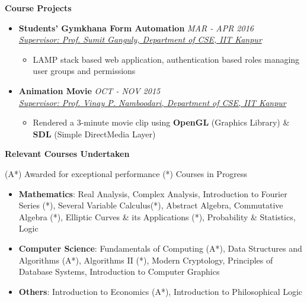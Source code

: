 \documentclass[letterpaper,11pt]{article}
\begin{document}
{\vspace{-1pt}
\Large{\textbf{Course Projects}}
\small
\vspace{-5pt}
\begin{itemize}
    \item \textbf{Students' Gymkhana Form Automation} \hfill \textit{MAR - APR 2016}\\
        \href{http://www.cse.iitk.ac.in/users/sganguly/}{\textit{Supervisor: Prof. Sumit Ganguly, Department of CSE, IIT Kanpur}}
    \vspace{-5pt}
    \begin{itemize}
        \item LAMP stack based web application, authentication based roles managing user groups and permissions
        \vspace{-2pt}
    \end{itemize}
    \vspace{-5pt}
    \item \textbf{Animation Movie} \hfill \textit{OCT - NOV 2015}\\
    \href{https://sites.google.com/site/vinaynamboodiri/}{\textit{Supervisor: Prof. Vinay P. Namboodari, Department of CSE, IIT Kanpur}}
    \vspace{-5pt}
    \begin{itemize}
        \item Rendered a 3-minute movie clip using \textbf{OpenGL} (Graphics Library) \& \textbf{SDL} (Simple DirectMedia Layer)
        \vspace{-2pt}
    \end{itemize}
\end{itemize}

\vspace{-1pt}
\Large{\textbf{Relevant Courses Undertaken}}
\footnotesize{\hfill(A*) Awarded for exceptional performance \hspace{0.25in}  (*) Courses in Progress\\
\small
\vspace{-5pt}
\begin{itemize}
    \item \textbf{Mathematics}:
        Real Analysis, Complex Analysis, Introduction to Fourier Series (*), Several Variable Calculus(*),
        Abstract Algebra, Commutative Algebra (*), Elliptic Curves \& its Applications (*),
        Probability \& Statistics, Logic\\
    \vspace{-2pt}
    \item \textbf{Computer Science}: Fundamentals of Computing (A*), Data Structures and Algorithms (A*), Algorithms II (*), Modern Cryptology, Principles of Database Systems, Introduction to Computer Graphics\\
    \vspace{-2pt}
    \item \textbf{Others}: Introduction to Economics (A*), Introduction to Philosophical Logic\\
    \vspace{-2pt}
\end{itemize}

}}
\end{document}
